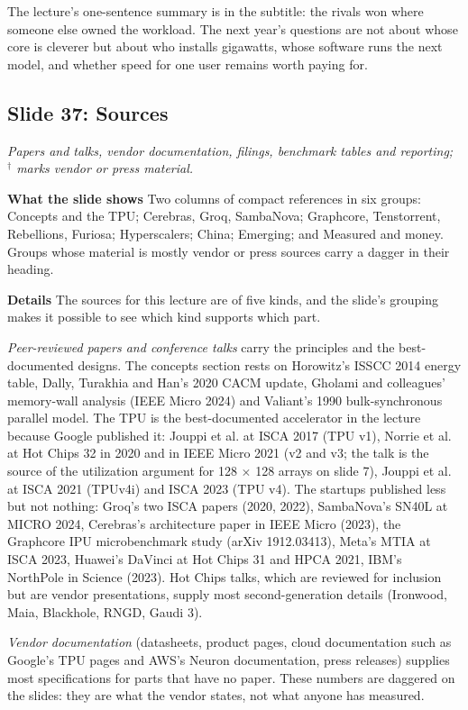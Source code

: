 \documentclass[11pt,letterpaper]{article}
\newcommand{\slide}[3]{%
  \subsection[Slide #1: #2]{Slide #1: #2}%
  {\color{muted}\itshape #3\par}\medskip}
\newcommand{\para}[1]{\medskip\noindent\textbf{#1}\quad}
\newenvironment{intuition}{\begin{tcolorbox}[intuitionbox]}{\end{tcolorbox}}
\begin{document}
\begin{intuition}
The lecture's one-sentence summary is in the subtitle: the rivals won where someone else owned the workload. The next year's questions are not about whose core is cleverer but about who installs gigawatts, whose software runs the next model, and whether speed for one user remains worth paying for.
\end{intuition}

\slide{37}{Sources}{Papers and talks, vendor documentation, filings, benchmark tables and reporting; $^\dagger$ marks vendor or press material.}

\para{What the slide shows} Two columns of compact references in six groups: Concepts and the TPU; Cerebras, Groq, SambaNova; Graphcore, Tenstorrent, Rebellions, Furiosa; Hyperscalers; China; Emerging; and Measured and money. Groups whose material is mostly vendor or press sources carry a dagger in their heading.

\para{Details} The sources for this lecture are of five kinds, and the slide's grouping makes it possible to see which kind supports which part.

\emph{Peer-reviewed papers and conference talks} carry the principles and the best-documented designs. The concepts section rests on Horowitz's ISSCC 2014 energy table, Dally, Turakhia and Han's 2020 CACM update, Gholami and colleagues' memory-wall analysis (IEEE Micro 2024) and Valiant's 1990 bulk-synchronous parallel model. The TPU is the best-documented accelerator in the lecture because Google published it: Jouppi et al. at ISCA 2017 (TPU v1), Norrie et al. at Hot Chips 32 in 2020 and in IEEE Micro 2021 (v2 and v3; the talk is the source of the utilization argument for 128 $\times$ 128 arrays on slide 7), Jouppi et al. at ISCA 2021 (TPUv4i) and ISCA 2023 (TPU v4). The startups published less but not nothing: Groq's two ISCA papers (2020, 2022), SambaNova's SN40L at MICRO 2024, Cerebras's architecture paper in IEEE Micro (2023), the Graphcore IPU microbenchmark study (arXiv 1912.03413), Meta's MTIA at ISCA 2023, Huawei's DaVinci at Hot Chips 31 and HPCA 2021, IBM's NorthPole in Science (2023). Hot Chips talks, which are reviewed for inclusion but are vendor presentations, supply most second-generation details (Ironwood, Maia, Blackhole, RNGD, Gaudi 3).

\emph{Vendor documentation} (datasheets, product pages, cloud documentation such as Google's TPU pages and AWS's Neuron documentation, press releases) supplies most specifications for parts that have no paper. These numbers are daggered on the slides: they are what the vendor states, not what anyone has measured.
\end{document}
